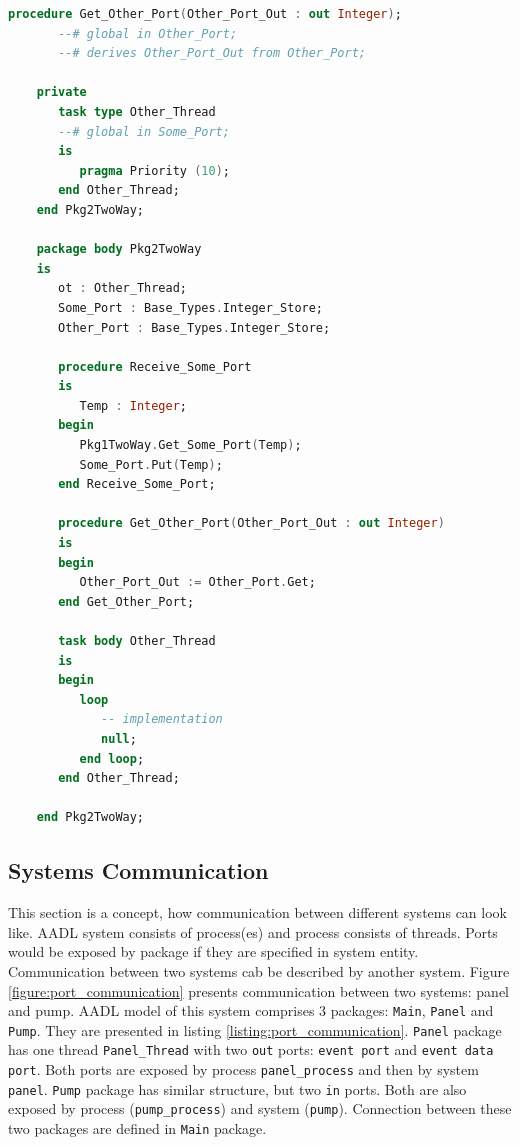 \begin{lstlisting}[language=ada, frame=single, gobble=0, caption={Two way port communication translated to SPARK Ada}, label={listing:port_communication_thread_two_way_spark}]
	   procedure Get_Other_Port(Other_Port_Out : out Integer);
	   --# global in Other_Port;
	   --# derives Other_Port_Out from Other_Port;

	private
	   task type Other_Thread
	   --# global in Some_Port;
	   is
	      pragma Priority (10);
	   end Other_Thread;
	end Pkg2TwoWay;

	package body Pkg2TwoWay
	is
	   ot : Other_Thread;
	   Some_Port : Base_Types.Integer_Store;
	   Other_Port : Base_Types.Integer_Store;
	   
	   procedure Receive_Some_Port
	   is
	      Temp : Integer;
	   begin
	      Pkg1TwoWay.Get_Some_Port(Temp);
	      Some_Port.Put(Temp);
	   end Receive_Some_Port;   
	   
	   procedure Get_Other_Port(Other_Port_Out : out Integer)
	   is
	   begin
	      Other_Port_Out := Other_Port.Get;
	   end Get_Other_Port;
	   
	   task body Other_Thread
	   is   
	   begin      
	      loop         
	         -- implementation
	         null;         
	      end loop;      
	   end Other_Thread;

	end Pkg2TwoWay;
\end{lstlisting} 
\doublespacing


\subsection{Systems Communication}
\label{codegen:port_communication:system}

This section is a concept, how communication between different systems can look like. AADL system consists of process(es) and process consists of threads. Ports would be exposed by package if they are specified in system entity. Communication between two systems cab be described by another system. Figure \ref{figure:port_communication} presents communication between two systems: panel and pump. AADL model of this system comprises 3 packages: \lstinline{Main}, \lstinline{Panel} and \lstinline{Pump}. They are presented in listing \ref{listing:port_communication}. \lstinline{Panel} package has one thread \lstinline{Panel_Thread} with two \lstinline{out} ports: \lstinline{event port} and \lstinline{event data port}. Both ports are exposed by process \lstinline{panel_process} and then by system \lstinline{panel}. \lstinline{Pump} package has similar structure, but two \lstinline{in} ports. Both are also exposed by process (\lstinline{pump_process}) and system (\lstinline{pump}). Connection between these two packages are defined in \lstinline{Main} package.

